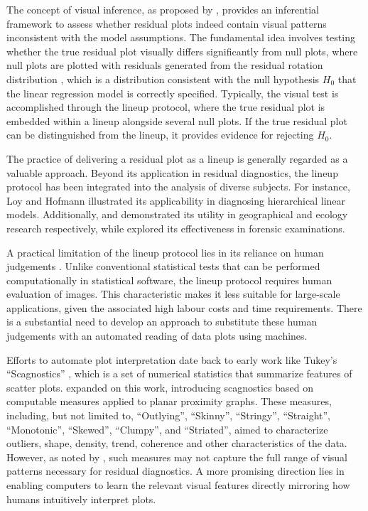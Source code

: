 \documentclass[]{interact}
\theoremstyle{plain}%
\theoremstyle{definition}
\theoremstyle{remark}
\begin{document}
The concept of visual inference, as proposed by
\citet{buja2009statistical}, provides an inferential framework to assess
whether residual plots indeed contain visual patterns inconsistent with
the model assumptions. The fundamental idea involves testing whether the
true residual plot visually differs significantly from null plots, where
null plots are plotted with residuals generated from the residual
rotation distribution \citep{langsrud2005rotation}, which is a
distribution consistent with the null hypothesis \(H_0\) that the linear
regression model is correctly specified. Typically, the visual test is
accomplished through the lineup protocol, where the true residual plot
is embedded within a lineup alongside several null plots. If the true
residual plot can be distinguished from the lineup, it provides evidence
for rejecting \(H_0\).

The practice of delivering a residual plot as a lineup is generally
regarded as a valuable approach. Beyond its application in residual
diagnostics, the lineup protocol has been integrated into the analysis
of diverse subjects. For instance, Loy and Hofmann
\citetext{\citeyear{loy2013diagnostic}; \citeyear{loy2014hlmdiag}; \citeyear{loy2015you}}
illustrated its applicability in diagnosing hierarchical linear models.
Additionally, \citet{widen2016graphical} and \citet{fieberg2024using}
demonstrated its utility in geographical and ecology research
respectively, while \citet{krishnan2021hierarchical} explored its
effectiveness in forensic examinations.

A practical limitation of the lineup protocol lies in its reliance on
human judgements \citep[see][ about the practical
limitations]{li2024plot}. Unlike conventional statistical tests that can
be performed computationally in statistical software, the lineup
protocol requires human evaluation of images. This characteristic makes
it less suitable for large-scale applications, given the associated high
labour costs and time requirements. There is a substantial need to
develop an approach to substitute these human judgements with an
automated reading of data plots using machines.

Efforts to automate plot interpretation date back to early work like
Tukey's ``Scagnostics'' \citep{tukey1985computer}, which is a set of
numerical statistics that summarize features of scatter plots.
\citet{wilkinson2005graph} expanded on this work, introducing
scagnostics based on computable measures applied to planar proximity
graphs. These measures, including, but not limited to, ``Outlying'',
``Skinny'', ``Stringy'', ``Straight'', ``Monotonic'', ``Skewed'',
``Clumpy'', and ``Striated'', aimed to characterize outliers, shape,
density, trend, coherence and other characteristics of the data.
However, as noted by \citet{buja2009statistical}, such measures may not
capture the full range of visual patterns necessary for residual
diagnostics. A more promising direction lies in enabling computers to
learn the relevant visual features directly mirroring how humans
intuitively interpret plots.
\end{document}
